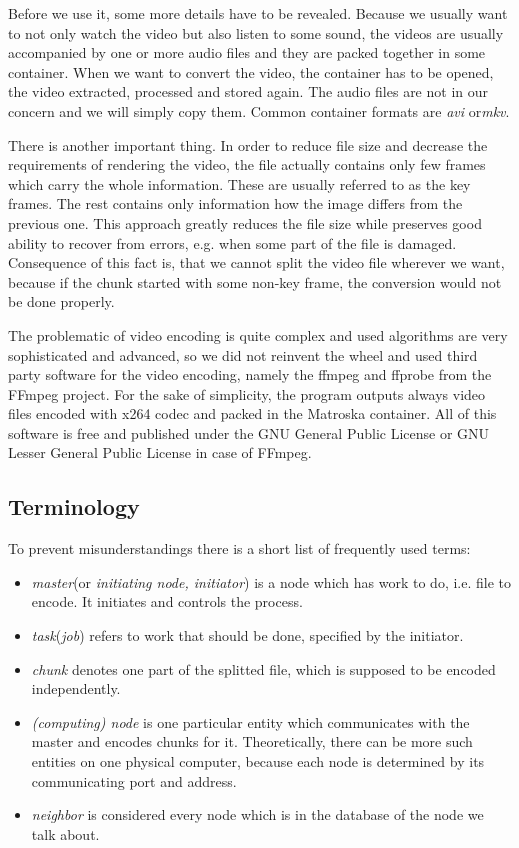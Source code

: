 Before we use it, some more details have to be revealed. Because we usually want to not only watch the video but also listen to some sound, the videos are usually accompanied by one or more audio files and they are packed together in some container. When we want to convert the video, the container has to be opened, the video extracted, processed and stored again. The audio files are not in our concern and we will simply copy them. Common container formats are \textit{avi} or\textit{mkv}.

There is another important thing. In order to reduce file size and decrease the requirements of rendering the video, the file actually contains only few frames which carry the whole information. These are usually referred to as the key frames. The rest contains only information how the image differs from the previous one. This approach greatly reduces the file size while preserves good ability to recover from errors, e.g. when some part of the file is damaged. Consequence of this fact is, that we cannot split the video file wherever we want, because if the chunk started with some non-key frame, the conversion would not be done properly.

The problematic of video encoding is quite complex and used algorithms are very sophisticated and advanced, so we did not reinvent the wheel and used third party software for the video encoding, namely the ffmpeg and ffprobe from the FFmpeg project. For the sake of simplicity, the program outputs always video files encoded with x264 codec and packed in the Matroska container. All of this software is free and published under the GNU General Public License or GNU Lesser General Public License in case of FFmpeg.

\subsection*{Terminology}
To prevent misunderstandings there is a short list of frequently used terms:
\begin{itemize}
\item \textit{master}(or \textit{initiating node, initiator}) is a node which has work to do, i.e. file to encode. It initiates and controls the process.
\item \textit{task}(\textit{job}) refers to work that should be done, specified by the initiator.
\item \textit{chunk} denotes one part of the splitted file, which is supposed to be encoded independently.
\item \textit{(computing) node} is one particular entity which communicates with the master and encodes chunks for it. Theoretically, there can be more such entities on one physical computer, because each node is determined by its communicating port and address.
\item \textit{neighbor} is considered every node which is in the database of the node we talk about.
\end{itemize}